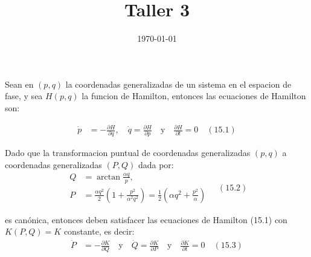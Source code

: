 \documentclass[a4paper]{article}
\date{\today}
\title{Taller 3}
\begin{document}
    \header{}

    
    \begin{answer}[Problema 1]
       Sean en  $(p,q)$ la coordenadas generalizadas de un sistema en el espacion de fase, y sea $H(p,q)$ la funcion de Hamilton, entonces las ecuaciones de Hamilton son:
        
        \begin{align*}
            \dot p &= -\frac{\partial H}{\partial q}, \quad \dot q = \frac{\partial H}{\partial p} \quad \text{y} \quad  \frac{\partial H}{\partial t} =0  \quad (15.1)
        \end{align*}

        Dado que la transformacion puntual de coordenadas generalizadas $(p,q)$ a coordenadas generalizadas $(P,Q)$ dada por:
        \begin{equation*}
            \begin{align*}  
                Q&=\arctan \frac{\alpha q}{p}, \\
                P&=\frac{\alpha q^2}{2}\left(1+\frac{p^2}{\alpha^2 q^2}\right) = \frac{1}{2}\left(\alpha q^2 + \frac{p^2}{\alpha} \right)
            \end{align*} \quad (15.2)
        \end{equation*}
      
        es canónica, entonces deben satisfacer las ecuaciones de Hamilton (15.1) con $K(P,Q) = K$ constante, es decir:
        \begin{align*}
            \dot P &= -\frac{\partial K}{\partial Q} \quad \text{y} \quad \dot Q = \frac{\partial K}{\partial P}  \quad \text{y} \quad \frac{\partial K}{\partial t} =0  \quad (15.3)
        \end{align*}


\end{answer}
\end{document}
